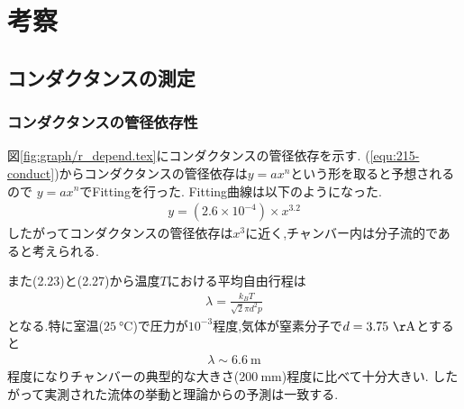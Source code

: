 \section{考察}
\subsection{コンダクタンスの測定}
\subsubsection{コンダクタンスの管径依存性}
図\ref{fig:graph/r_depend.tex}にコンダクタンスの管径依存を示す.
(\ref{equ:215-conduct})からコンダクタンスの管径依存は$y=ax^n$という形を取ると予想されるので
$y=ax^n$でFittingを行った.
Fitting曲線は以下のようになった.
\begin{align}
  y=(2.6\times10^{-4})\times x^{3.2}
\end{align}
したがってコンダクタンスの管径依存は$x^3$に近く,チャンバー内は分子流的であると考えられる.

また(2.23)と(2.27)から温度$T$における平均自由行程は
\begin{align}
  \lambda=\frac{k_BT}{\sqrt{2}\pi d^2 p}
\end{align}
となる.特に室温($25\ \si{\degreeCelsius}$)で圧力が$10^{-3}$程度,気体が窒素分子で$d=3.75\ \si{\AA}$とすると
\begin{align}
  \lambda\sim 6.6\ \si{\metre}
\end{align}
程度になりチャンバーの典型的な大きさ($200\ \si{\milli\metre}$)程度に比べて十分大きい.
したがって実測された流体の挙動と理論からの予測は一致する.


